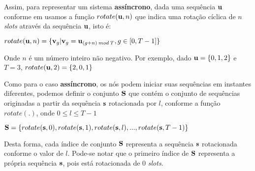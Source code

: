 Assim, para representar um sistema {\bf assíncrono}, dada uma sequência ${\bf u}$ conforme em \cite{ach} usamos a função $rotate({\bf u},n)$ que indica uma rotação cíclica de $n$ {\it slots} através da sequência ${\bf u}$, isto é:

\vspace{0.3cm}

$rotate({\bf u},n) = \{{\bf v}_{g} | {\bf v}_{g} = {\bf u}_{(g+n) \: mod \: T},g \in [0,T-1]\}$

\vspace{0.3cm}

Onde $n$ é um número inteiro não negativo. Por exemplo, dado ${\bf u} = \{0,1,2\}$ e $T = 3$, $rotate({\bf u},2) = \{2,0,1\}$







Como para o caso {\bf assíncrono}, os nós podem iniciar suas sequências em instantes diferentes, podemos definir o conjunto ${\bf S}$ que contém o conjunto de sequências originadas a partir da sequência ${\bf s}$ rotacionada por $l$, conforme a função $rotate(.)$, onde $0 \leq l \leq T-1$  

\vspace{0.3cm}

${\bf S} = \{ rotate({\bf s},0), rotate({\bf s},1), rotate({\bf s}, l), ... , rotate({\bf s},T-1)\}$ 


\vspace{0.3cm}

Desta forma, cada índice de conjunto ${\bf S}$ representa a sequência ${\bf s}$ rotacionada conforme o valor de $l$. Pode-se notar que o primeiro índice de ${\bf S}$ representa a própria sequência ${\bf s}$, pois está rotacionada de 0 {\it slots}.


